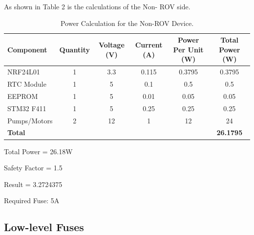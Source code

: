 \documentclass[11pt, twocolumn]{article}
\begin{document}
As shown in Table 2 is the calculations of the Non- ROV side.

\begin{table}[h!]
  \centering
  \begin{adjustbox}{max width=\columnwidth}
  \begin{tabular}{@{} l *{5}{c} @{}}
    \toprule
    \textbf{Component} & \textbf{Quantity} & \textbf{Voltage (V)} & \textbf{Current (A)} & \textbf{Power Per Unit (W)} & \textbf{Total Power (W)} \\
    \midrule
    NRF24L01            & 1 & 3.3   & 0.115     & 0.3795    & 0.3795   \\
    RTC Module                & 1 & 5   & 0.1   & 0.5    & 0.5   \\
    EEPROM           & 1 & 5    & 0.01      & 0.05     & 0.05     \\
    STM32 F411           & 1 & 5   & 0.25      & 0.25     & 0.25   \\
    Pumps/Motors	& 2	& 12	& 1	& 12	& 24 \\
    \midrule
   \multicolumn{5}{l}{\textbf{Total}} & \textbf{26.1795} \\
    \bottomrule
  \end{tabular}
  \end{adjustbox}
\caption{Power Calculation for the Non-ROV Device.}
\label{tab:power_calculation}
\end{table}

Total Power = 26.18W

Safety Factor = 1.5

Result = 3.2724375

Required Fuse: 5A

\subsection{Low-level Fuses}
\end{document}

